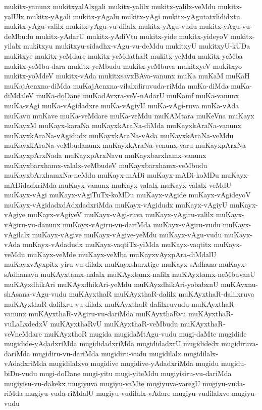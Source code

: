 {mukitx-yanunx
mukitxyalAlxgali
mukitx-yalilx
mukitx-yalilx-veMdu
mukitx-yalUlx
mukitx-yAgali
mukitx-yAgalu
mukitx-yAgi
mukitx-yAgutatxlididxtu
mukitx-yAgu-valilx
mukitx-yAgu-vu-dilalx
mukitx-yAgu-vudu
mukitx-yAgu-vu-deMbudu
mukitx-yAdarU
mukitx-yAdiVtu
mukitx-yide
mukitx-yideyoV
mukitx-yilalx
mukitxyu
mukitxyu-sidadhx-vAgu-vu-deMdu
mukitxyU
mukitxyU-kUDa
mukitxye
mukitx-yeMdare
mukitx-yeMdathaR
mukitx-yeMdu
mukitx-yeMba
mukitx-yeMbu-dara
mukitx-yeMbudu
mukitx-yeMbuva
mukitxyeV
mukitxyo
mukitx-yoMdeV
mukitx-vAda
mukitxsavxBAva-vanunx
muKa
muKaM
muKaH
muKajAcnxna-diMda
muKajAcnxna-vilalxdiruvuda-riMda
muKa-diMda
muKa-diMdaleV
muKa-doDane
muKadAvxra-veV-nAdarU
muKamf
muKa-vanunx
muKa-vAgi
muKa-vAgidadxre
muKa-vAgiyU
muKa-vAgi-ruva
muKa-vAda
muKavu
muKave
muKa-veMdare
muKa-veMdu
muKAMtara
muKeVna
muKayx
muKayxM
muKayx-karaNa
muKayxkAraNa-diMda
muKayxkAraNa-vanunx
muKayxkAraNa-vAgidudx
muKayxkAraNa-vAda
muKayxkAraNa-veMdu
muKayxkAraNa-veMbudanunx
muKayxkAraNa-venunx-varu
muKayxpArxNa
muKayxpArxNada
muKayxpArxNavu
muKayxbarxhamx-vanunx
muKayxbarxhamx-valalx-veMbudeV
muKayxbarxhamx-veMbudu
muKayxbArxhamxNa-neMdu
muKayx-mADi
muKayx-mADi-koMDu
muKayx-mADidadxriMda
muKayx-vanunx
muKayx-valalx
muKayx-valalx-veMdU
muKayx-vAgi
muKayx-vAgiTuTx-koMDu
muKayx-vAgide
muKayx-vAgideyoV
muKayx-vAgidadxdAdxdadxriMda
muKayx-vAgidudx
muKayx-vAgiyU
muKayx-vAgiye
muKayx-vAgiyeV
muKayx-vAgi-ruva
muKayx-vAgiru-valilx
muKayx-vAgiru-vu-danunx
muKayx-vAgiru-vu-dariMda
muKayx-vAgiru-vudu
muKayx-vAgilalx
muKayx-vAgive
muKayx-vAgive-yeMdu
muKayx-vAgu-vudu
muKayx-vAda
muKayx-vAdadudx
muKayx-vaqtiTx-yiMda
muKayx-vaqtitx
muKayx-veMdu
muKayx-veMde
muKayx-veMba
muKayxvAyxpAra-diMdalU
muKayxvAyxpitx-yiru-vu-dilalx
muKayxshurxtige
muKayx-sAdhana
muKayx-sAdhanavu
muKAyxtamx-nalalx
muKAyxtamx-nalilx
muKAyxtamx-neMbuvanU
muKAyxdhikAri
muKAyxdhikAri-yeMdu
muKAyxdhikAri-yobabxnU
muKAyxnu-shAsana-vAgu-vudu
muKAyxthaR
muKAyxthaR-dalilx
muKAyxthaR-dalilxruva
muKAyxthaR-dalilxru-vu-dilalx
muKAyxthaR-dalilxruvudu
muKAyxthaR-vanunx
muKAyxthaR-vAgiru-vu-dariMda
muKAyxthaRvu
muKAyxthaR-vuLaLxdedxV
muKAyxthaRvU
muKAyxthaR-veMbudu
muKAyxthaR-veVneMdare
muKAyxthoR
mugida
mugidaMtAgu-vudu
mugi-daMte
mugidide
mugidide-yAdadxriMda
mugididadxriMda
mugididadxrU
mugididedx
mugidiruva-dariMda
mugidiru-vu-dariMda
mugidiru-vudu
mugidilalx
mugidilalx-vAdadxriMda
mugidilalxvo
mugidive
mugidive-yAdadxriMda
mugidu
mugidu-biDu-vudu
mugi-doDane
mugi-yitu
mugi-yiteMdu
mugiyisiru-vu-dariMda
mugiyisu-vu-dakekx
mugiyuva
mugiyu-vaMte
mugiyuva-varegU
mugiyu-vuda-riMda
mugiyu-vuda-riMdalU
mugiyu-vudilalx-vAdare
mugiyu-vudilalxve
mugiyu-vudu
}
